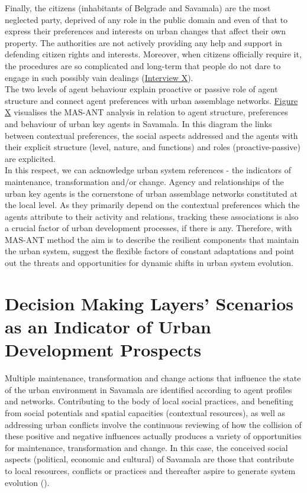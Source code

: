 \documentclass[11pt]{report}
\begin{document}
Finally, the citizens (inhabitants of Belgrade and Savamala) are the most neglected party, deprived of any role in the public domain and even of that to express their preferences and interests on urban changes that affect their own property. 
The authorities are not actively providing any help and support in defending citizen rights and interests.
Moreover, when citizens officially require it, the procedures are so complicated and long-term that people do not dare to engage in such possibly vain dealings
(\href{InterviewX}{Interview X}).
\\

The two levels of agent behaviour explain proactive or passive role of agent structure and connect agent preferences with urban assemblage networks.
\href{FigureX}{Figure X} visualises the MAS-ANT analysis in relation to agent structure, preferences and behaviour of urban key agents in Savamala.
In this diagram the links between contextual preferences, the social aspects addressed and the agents with their explicit structure (level, nature, and functions) and roles (proactive-passive) are explicited.
\\

In this respect, we can acknowledge urban system references - the indicators of maintenance, transformation and/or change.
Agency and relationships of the urban key agents is the cornerstone of urban assemblage networks constituted at the local level.
As they primarily depend on the contextual preferences which the agents attribute to their activity and relations, tracking these associations is also a crucial factor of urban development processes, if there is any.
Therefore, with MAS-ANT method the aim is to describe the resilient components that maintain the urban system, suggest the flexible factors of constant adaptations and point out the threats and opportunities for dynamic shifts in urban system evolution.



\section{Decision Making Layers' Scenarios as an Indicator of Urban Development Prospects}

Multiple maintenance, transformation and change actions that influence the state of the urban environment in Savamala are identified according to agent profiles and networks.
Contributing to the body of local social practices, and benefiting from social potentials and spatial capacities (contextual resources), as well as addressing urban conflicts involve the continuous reviewing of how the collision of these positive and negative influences actually produces a variety of opportunities for maintenance, transformation and change.
In this case, the conceived social aspects (political, economic and cultural) of Savamala are those that contribute to local resources, conflicts or practices and thereafter aspire to generate system evolution (\href{Cvetinovic}{\cite{CvetinovicEtAl.2013}}). 
\\
\end{document}

